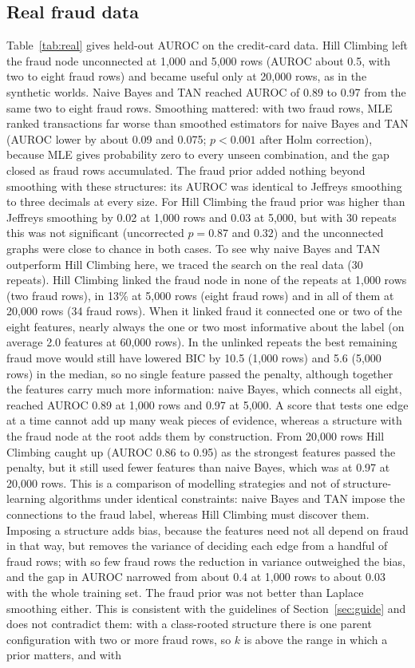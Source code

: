 \documentclass[final,5p,times,authoryear]{elsarticle}
\begin{document}
\subsection{Real fraud data}\label{sec:real}
Table~\ref{tab:real} gives held-out AUROC on the credit-card data. Hill Climbing left the fraud node unconnected at 1,000 and 5,000 rows (AUROC about 0.5, with two to eight fraud rows) and became useful only at 20,000 rows, as in the synthetic worlds. Naive Bayes and TAN reached AUROC of 0.89 to 0.97 from the same two to eight fraud rows. Smoothing mattered: with two fraud rows, MLE ranked transactions far worse than smoothed estimators for naive Bayes and TAN (AUROC lower by about 0.09 and 0.075; $p<0.001$ after Holm correction), because MLE gives probability zero to every unseen combination, and the gap closed as fraud rows accumulated. The fraud prior added nothing beyond smoothing with these structures: its AUROC was identical to Jeffreys smoothing to three decimals at every size. For Hill Climbing the fraud prior was higher than Jeffreys smoothing by 0.02 at 1,000 rows and 0.03 at 5,000, but with 30 repeats this was not significant (uncorrected $p=0.87$ and $0.32$) and the unconnected graphs were close to chance in both cases. To see why naive Bayes and TAN outperform Hill Climbing here, we traced the search on the real data (30 repeats). Hill Climbing linked the fraud node in none of the repeats at 1,000 rows (two fraud rows), in 13\% at 5,000 rows (eight fraud rows) and in all of them at 20,000 rows (34 fraud rows). When it linked fraud it connected one or two of the eight features, nearly always the one or two most informative about the label (on average 2.0 features at 60,000 rows). In the unlinked repeats the best remaining fraud move would still have lowered BIC by 10.5 (1,000 rows) and 5.6 (5,000 rows) in the median, so no single feature passed the penalty, although together the features carry much more information: naive Bayes, which connects all eight, reached AUROC 0.89 at 1,000 rows and 0.97 at 5,000. A score that tests one edge at a time cannot add up many weak pieces of evidence, whereas a structure with the fraud node at the root adds them by construction. From 20,000 rows Hill Climbing caught up (AUROC 0.86 to 0.95) as the strongest features passed the penalty, but it still used fewer features than naive Bayes, which was at 0.97 at 20,000 rows. This is a comparison of modelling strategies and not of structure-learning algorithms under identical constraints: naive Bayes and TAN impose the connections to the fraud label, whereas Hill Climbing must discover them. Imposing a structure adds bias, because the features need not all depend on fraud in that way, but removes the variance of deciding each edge from a handful of fraud rows; with so few fraud rows the reduction in variance outweighed the bias, and the gap in AUROC narrowed from about 0.4 at 1,000 rows to about 0.03 with the whole training set. The fraud prior was not better than Laplace smoothing either. This is consistent with the guidelines of Section~\ref{sec:guide} and does not contradict them: with a class-rooted structure there is one parent configuration with two or more fraud rows, so $k$ is above the range in which a prior matters, and with 
\end{document}
